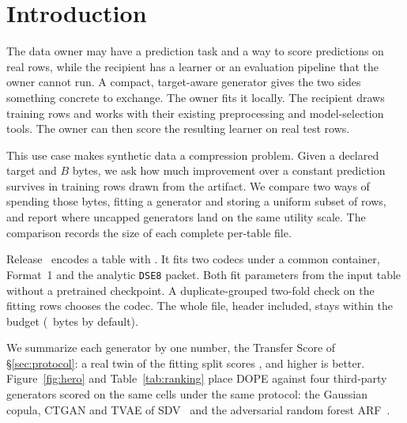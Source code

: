 \section{Introduction}\label{sec:intro}

The data owner may have a prediction task and a way to score predictions on real rows, while the recipient has a learner or an evaluation pipeline that the owner cannot run. A compact, target-aware generator gives the two sides something concrete to exchange. The owner fits it locally. The recipient draws training rows and works with their existing preprocessing and model-selection tools. The owner can then score the resulting learner on real test rows.

This use case makes synthetic data a compression problem. Given a declared target and $B$ bytes, we ask how much improvement over a constant prediction survives in training rows drawn from the artifact. We compare two ways of spending those bytes, fitting a generator and storing a uniform subset of rows, and report where uncapped generators land on the same utility scale. The comparison records the size of each complete per-table file.

Release~ encodes a table with .
It fits two codecs under a common container, Format~1 and the analytic \texttt{DSE8} packet. Both fit parameters from the input table without a pretrained checkpoint. A duplicate-grouped two-fold check on the fitting rows chooses the codec.
The whole file, header included, stays within the budget (~bytes by default).

We summarize each generator by one number, the Transfer Score of \S\ref{sec:protocol}: a real twin of the fitting split scores , and higher is better.
Figure~\ref{fig:hero} and Table~\ref{tab:ranking} place DOPE against four third-party generators scored on the same cells under the same protocol: the Gaussian copula, CTGAN and TVAE of SDV~\citep{patki2016sdv,xu2019ctgan} and the adversarial random forest ARF~\citep{watson2023arf}.


